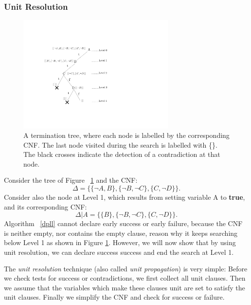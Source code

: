 \documentclass[12pt]{diicc}
\begin{document}
\subsubsection{Unit Resolution}

\begin{figure}[h!]
	\centering
		\includegraphics[width=0.7\textwidth]{termination_trees}
	\caption{A termination tree, where each node is labelled by the corresponding CNF. The last node visited during the search is labelled with \{\}. The black crosses indicate the detection of a contradiction at that node.}
	\label{fig:terminationtree}
\end{figure}

Consider the tree of Figure ~\ref{fig:terminationtree} and the CNF:
\[\Delta=\{\{\neg A,B\},\{\neg B,\neg C\},\{C,\neg D\}\}.\]
Consider also the node at Level 1, which results from setting variable A to \textbf{true}, and its corresponding CNF:
\[\Delta |A=\{\{B\},\{\neg B,\neg C\},\{C,\neg D\}\}.\]
Algorithm ~\ref{dpll} cannot declare early success or early failure, because the CNF is neither empty, nor contains the empty clause, reason why it keeps searching below Level 1 as shown in Figure \ref{fig:terminationtree}. However, we will now show that by using unit resolution, we can declare success success and end the search at Level 1.

The \textit{unit resolution} technique (also called \textit{unit propagation}) is very simple: Before we check tests for success or contradictions, we first collect all unit clauses. Then we assume that the variables which make these clauses unit are set to satisfy the unit clauses. Finally we simplify the CNF and check for success or failure.
\end{document}

